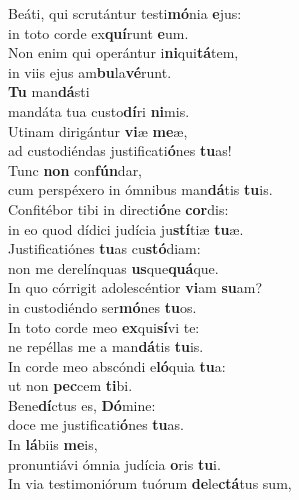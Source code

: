\evenverse Beáti, qui scrutántur testi\textbf{mó}nia \textbf{e}jus:~\*\\
\evenverse in toto corde ex\textbf{quí}runt \textbf{e}um.\\
\oddverse Non enim qui operántur i\textbf{ni}qui\textbf{tá}tem,~\*\\
\oddverse in viis ejus am\textbf{bu}la\textbf{vé}runt.\\
\evenverse \textbf{Tu} man\textbf{dá}sti~\*\\
\evenverse mandáta tua custo\textbf{dí}ri \textbf{ni}mis.\\
\oddverse Utinam dirigántur \textbf{vi}æ \textbf{me}æ,~\*\\
\oddverse ad custodiéndas justificati\textbf{ó}nes \textbf{tu}as!\\
\evenverse Tunc \textbf{non} con\textbf{fún}dar,~\*\\
\evenverse cum perspéxero in ómnibus man\textbf{dá}tis \textbf{tu}is.\\
\oddverse Confitébor tibi in directi\textbf{ó}ne \textbf{cor}dis:~\*\\
\oddverse in eo quod dídici judícia ju\textbf{stí}tiæ \textbf{tu}æ.\\
\evenverse Justificatiónes \textbf{tu}as cu\textbf{stó}diam:~\*\\
\evenverse non me derelínquas \textbf{us}que\textbf{quá}que.\\
\oddverse In quo córrigit adolescéntior \textbf{vi}am \textbf{su}am?~\*\\
\oddverse in custodiéndo ser\textbf{mó}nes \textbf{tu}os.\\
\evenverse In toto corde meo \textbf{ex}qui\textbf{sí}vi te:~\*\\
\evenverse ne repéllas me a man\textbf{dá}tis \textbf{tu}is.\\
\oddverse In corde meo abscóndi e\textbf{ló}quia \textbf{tu}a:~\*\\
\oddverse ut non \textbf{pec}cem \textbf{ti}bi.\\
\evenverse Bene\textbf{dí}ctus es, \textbf{Dó}mine:~\*\\
\evenverse doce me justificati\textbf{ó}nes \textbf{tu}as.\\
\oddverse In \textbf{lá}biis \textbf{me}is,~\*\\
\oddverse pronuntiávi ómnia judícia \textbf{o}ris \textbf{tu}i.\\
\evenverse In via testimoniórum tuórum \textbf{de}le\textbf{ctá}tus sum,~\*\\
